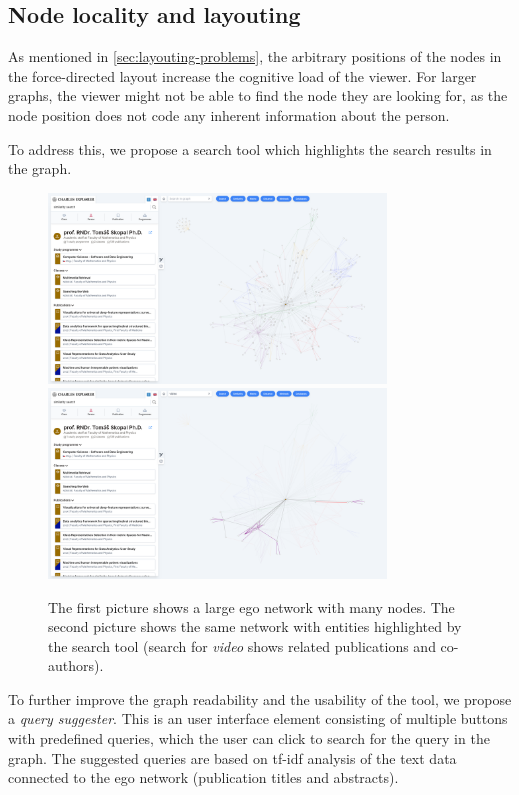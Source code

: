 \subsection{Node locality and layouting}

As mentioned in \ref{sec:layouting-problems}, the arbitrary positions of the nodes in the force-directed layout increase the cognitive load of the viewer.
For larger graphs, the viewer might not be able to find the node they are looking for, as the node position does not code any inherent information about the person.

To address this, we propose a search tool which highlights the search results in the graph.

\begin{figure}[ht!]
    \captionsetup{width=.9\linewidth}
    \includegraphics[width=0.8\textwidth]{../img/big-network.png}
    \includegraphics[width=0.8\textwidth]{../img/big-network-search.png}
    \centering
    \caption{The first picture shows a large ego network with many nodes. The second picture shows the same network with entities highlighted by the search tool (search for \textit{video} shows related publications and co-authors).}
\end{figure}

To further improve the graph readability and the usability of the tool, we propose a \textit{query suggester}. 
This is an user interface element consisting of multiple buttons with predefined queries, which the user can click to search for the query in the graph.
The suggested queries are based on tf-idf analysis of the text data connected to the ego network (publication titles and abstracts). 


